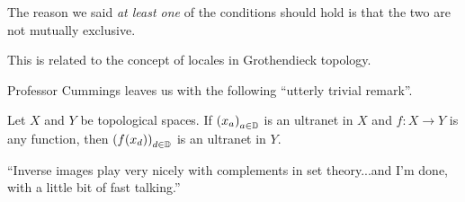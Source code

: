 The reason we said \textit{at least one} of the conditions should hold is that the two are not mutually exclusive. \sorry{}

This is related to the concept of locales in Grothendieck topology.

Professor Cummings leaves us with the following ``utterly trivial remark''.

\begin{boxexercise}\label{Ch2:Exo:Ultranet_comp}
    Let $X$ and $Y$ be topological spaces. If $\left( x_a \right)_{a \in \mathbb{D}}$ is an ultranet in $X$ and $f : X \to Y$ is any function, then $\left( f\!\left( x_d \right) \right)_{d \in \mathbb{D}}$ is an ultranet in $Y$.
\end{boxexercise}
\begin{remark}
    ``Inverse images play very nicely with complements in set theory...and I'm done, with a little bit of fast talking.''
\end{remark} 